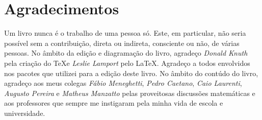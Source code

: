 {}
\chapter*{Agradecimentos}

Um livro nunca é o trabalho de uma pessoa só. Este, em particular, não seria possível sem a contribuição, direta ou indireta, consciente ou não, de várias pessoas. No âmbito da edição e diagramação do livro, agradeço \emph{Donald Knuth} pela criação do \TeX  e \emph{Leslie Lamport} pelo \LaTeX. Agradeço a todos envolvidos nos pacotes que utilizei para a edição deste livro. No âmbito do contúdo do livro, agradeço aos meus colegas \emph{Fábio Meneghetti}, \emph{Pedro Caetano}, \emph{Caio Laurenti}, \emph{Augusto Pereira} e \emph{Matheus Manzatto} pelas proveitosas discussões matemáticas e aos professores que sempre me instigaram pela minha vida de escola e universidade.